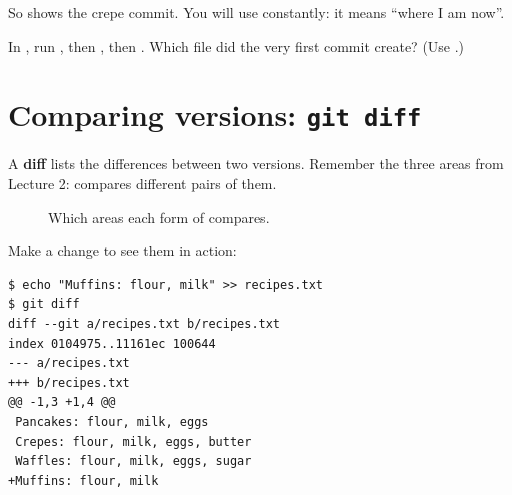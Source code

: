 So  shows the crepe commit. You will use  constantly: it means ``where I am now''.

\begin{tryit}
In , run , then , then . Which file did the very first commit create? (Use .)
\end{tryit}

\section{Comparing versions: \texttt{git diff}}

A \textbf{diff} lists the differences between two versions. Remember the three areas from Lecture 2:  compares different pairs of them.

\begin{figure}[H]
\centering
{}
\caption{Which areas each form of  compares.}
\label{fig:diff}
\end{figure}

Make a change to see them in action:

\begin{lstlisting}
$ echo "Muffins: flour, milk" >> recipes.txt
$ git diff
diff --git a/recipes.txt b/recipes.txt
index 0104975..11161ec 100644
--- a/recipes.txt
+++ b/recipes.txt
@@ -1,3 +1,4 @@
 Pancakes: flour, milk, eggs
 Crepes: flour, milk, eggs, butter
 Waffles: flour, milk, eggs, sugar
+Muffins: flour, milk
\end{lstlisting}

